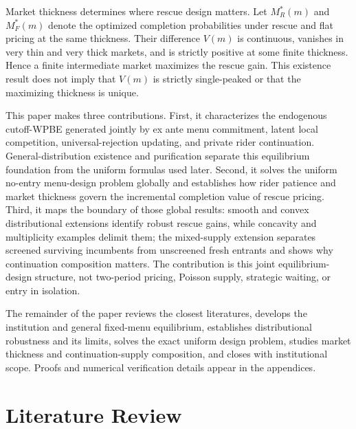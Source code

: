 \documentclass[mnsc,blindrev]{informs3}
\begin{document}
Market thickness determines where rescue design matters.  Let $M_R^*(m)$ and
$M_F^*(m)$ denote the optimized completion probabilities under rescue and flat
pricing at the same thickness.  Their difference $V(m)$ is continuous,
vanishes in very thin and very thick markets, and is strictly positive at some
finite thickness.  Hence a finite intermediate market maximizes the rescue
gain.  This existence result does not imply that $V(m)$ is strictly
single-peaked or that the maximizing thickness is unique.

This paper makes three contributions.  First, it characterizes the
endogenous cutoff-WPBE generated jointly by ex ante menu commitment, latent
local competition, universal-rejection updating, and private rider
continuation.  General-distribution existence and purification separate this
equilibrium foundation from the uniform formulas used later.  Second, it
solves the uniform no-entry menu-design problem globally and establishes how
rider patience and market thickness govern the incremental completion value
of rescue pricing.  Third, it maps the boundary of those global results:
smooth and convex distributional extensions identify robust rescue gains,
while concavity and multiplicity examples delimit them; the mixed-supply
extension separates screened surviving incumbents from unscreened fresh
entrants and shows why continuation composition matters.  The contribution
is this joint equilibrium-design structure, not two-period pricing, Poisson
supply, strategic waiting, or entry in isolation.

The remainder of the paper reviews the closest literatures, develops the
institution and general fixed-menu equilibrium, establishes distributional
robustness and its limits, solves the exact uniform design problem, studies
market thickness and continuation-supply composition, and closes with
institutional scope.  Proofs and numerical verification details appear in the
appendices.

\section{Literature Review}
\label{sec:literature}
\end{document}
